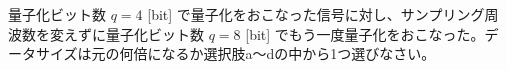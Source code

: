 量子化ビット数 $q = 4$ [bit] で量子化をおこなった信号に対し、サンプリング周波数を変えずに量子化ビット数 $q = 8$ [bit] でもう一度量子化をおこなった。データサイズは元の何倍になるか選択肢a〜dの中から1つ選びなさい。
